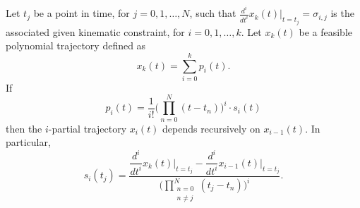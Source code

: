 \begin{theorem}
\label{theorem:rst_theorem1}
Let $t_j$ be a point in time, for $j=0,1,\dots, N$, such that $\frac{d^i}{dt^i}x_k(t)\bigr|_{t=t_j}=\sigma_{i,j}$ is the associated given kinematic constraint, for $i=0,1,\dots, k$. Let $x_k(t)$ be a feasible polynomial trajectory defined as
\begin{equation}
x_k(t) = \sum_{i=0}^{k}{p_i(t)}.
\end{equation}
If
\begin{equation}
p_i(t)=\dfrac{1}{i!}\biggl(\prod_{n=0}^{N}{(t-t_n)}\biggr)^i\cdot s_i(t)
\end{equation}
then the $i$-partial trajectory $x_i(t)$ depends recursively on $x_{i-1}(t)$. In particular,
\begin{equation}
s_i(t_j)=\dfrac{\dfrac{d^i}{dt^i}x_k(t)\biggr|_{t=t_j} -\dfrac{d^i}{dt^i}x_{i-1}(t)\biggr|_{t=t_j}}{\displaystyle \Biggl(\prod_{\substack{n=0\\ n\neq j}}^{N}{(t_j-t_n)}\Biggr)^i}.
\label{eq:rst_recursive}
\end{equation}
\end{theorem}

